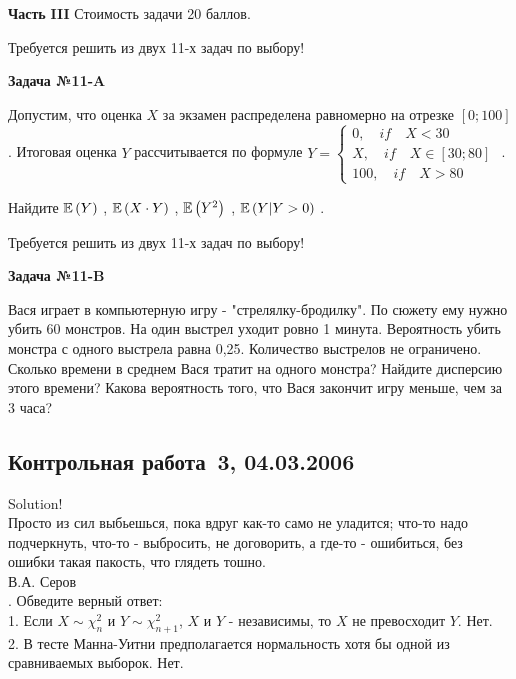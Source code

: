 \documentclass[pdftex,12pt,a4paper]{article}
\begin{document}
{\bf Часть }{\bf III} Стоимость задачи 20 баллов.

Требуется решить {\bf {}} из двух 11-х задач по выбору!

{\bf Задача №1}{\bf 1-}{\bf A}

Допустим, что оценка  $X$  за экзамен распределена равномерно на отрезке  $\left[0;100\right]$ . Итоговая оценка  $Y$  рассчитывается по формуле  $Y=\left\{\begin{array}{l} {0,\quad if\quad X<30} \\ {X,\quad if\quad X\in \left[30;80\right]} \\ {100,\quad if\quad X>80} \end{array}\right. $ .

Найдите  $\mathbb{E}\left(Y\right)$ ,  $\mathbb{E}\left(X\cdot Y\right)$ ,  $\mathbb{E}\left(Y^{2} \right)$ ,  $\mathbb{E}\left(Y|Y>0\right)$ .

Требуется решить {\bf {}} из двух 11-х задач по выбору!

{\bf Задача №}{\bf 11}{\bf -}{\bf B}

Вася играет в компьютерную игру - "стрелялку-бродилку". По сюжету ему нужно убить 60 монстров. На один выстрел уходит ровно 1 минута. Вероятность убить монстра с одного выстрела равна 0,25. Количество выстрелов не ограничено. Сколько времени в среднем Вася тратит на одного монстра? Найдите дисперсию этого времени? Какова вероятность того, что Вася закончит игру меньше, чем за 3 часа?

\subsection{Контрольная работа \No\,3, 04.03.2006}


Solution! \\

Просто из сил выбьешься, пока вдруг как-то само не уладится;
что-то надо подчеркнуть, что-то - выбросить, не договорить, а
где-то - ошибиться, без ошибки такая пакость, что глядеть тошно. \\
В.А. Серов \\




. Обведите верный ответ: \\

1. Если $X\sim \chi_{n}^{2}$ и $Y\sim \chi_{n+1}^{2}$, $X$ и $Y$ -
независимы, то  $X$ не превосходит $Y$. Нет.  \\

2. В тесте Манна-Уитни предполагается нормальность хотя бы одной
из сравниваемых выборок. Нет. \\
\end{document}
